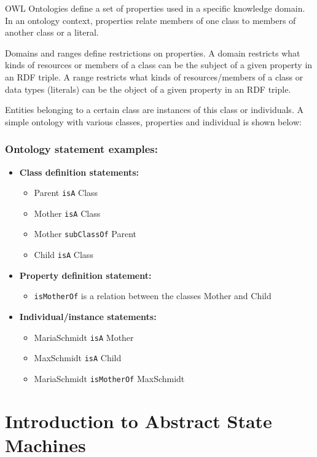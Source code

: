 OWL Ontologies define a set of properties used in a specific knowledge domain. In an ontology context, properties relate members of one class to members of another class or a literal.

Domains and ranges define restrictions on properties. A domain restricts what kinds of resources or members of a class can be the subject of a given property in an RDF triple. A range restricts what kinds of resources/members of a class or data types (literals) can be the object of a given property in an RDF triple.

Entities belonging to a certain class are instances of this class or individuals. A simple ontology with various classes, properties and individual is shown below:

\subsubsection{Ontology statement examples:}

\begin{itemize}
	\item \textbf {Class definition statements:}
	\begin{itemize}
		\item Parent \texttt{isA} Class
		\item Mother \texttt{isA} Class
		\item Mother \texttt{subClassOf} Parent
		\item Child \texttt{isA} Class
	\end{itemize}
	\item \textbf {Property definition statement:}
	\begin{itemize}
		\item \texttt{isMotherOf} is a relation between the classes Mother and Child
	\end{itemize}
	\item \textbf{Individual/instance statements:}
	\begin{itemize}
		\item MariaSchmidt \texttt{isA} Mother
		\item MaxSchmidt \texttt{isA} Child
		\item MariaSchmidt \texttt{isMotherOf} MaxSchmidt
	\end{itemize}
\end{itemize}

\section{Introduction to Abstract State Machines}

